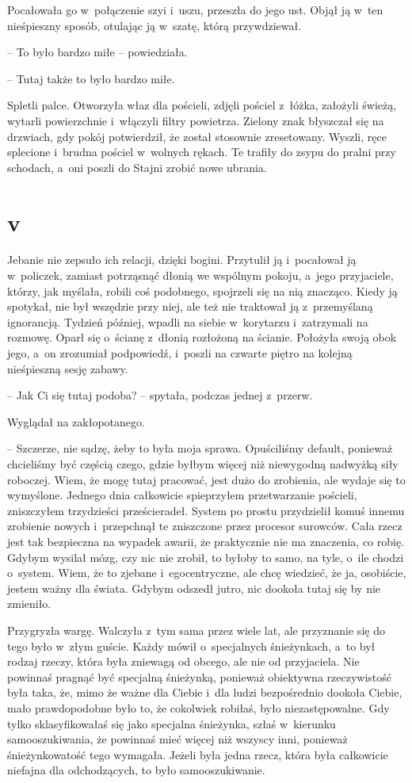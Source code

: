 \documentclass[oneside,polish,11pt,sfheadings]{mwbk}
\begin{document}
Pocałowała go w~połączenie szyi i~uszu, przeszła do jego ust. Objął ją w~ten nieśpieszny sposób, otulając ją w~szatę, którą przywdziewał.

-- To było bardzo miłe -- powiedziała.

-- Tutaj także to było bardzo miłe.

Spletli palce. Otworzyła właz dla pościeli, zdjęli pościel z~łóżka,
założyli świeżą, wytarli powierzchnie i~włączyli filtry powietrza.
Zielony znak błyszczał się na drzwiach, gdy pokój potwierdził, że został
stosownie zresetowany. Wyszli, ręce splecione i~brudna pościel w~wolnych
rękach. Te trafiły do zsypu do pralni przy schodach, a~oni poszli do
Stajni zrobić nowe ubrania.

\chapter*{v}

Jebanie nie zepsuło ich relacji, dzięki bogini. Przytulił ją i~pocałował
ją w~policzek, zamiast potrząsnąć dłonią we wspólnym pokoju, a~jego
przyjaciele, którzy, jak myślała, robili coś podobnego, spojrzeli się
na nią znacząco. Kiedy ją spotykał, nie był wszędzie przy niej, ale też
nie traktował ją z~przemyślaną ignorancją. Tydzień później, wpadli na
siebie w~korytarzu i~zatrzymali na rozmowę. Oparł się o~ścianę z~dłonią
rozłożoną na ścianie. Położyła swoją obok jego, a~on zrozumiał
podpowiedź, i~poszli na czwarte piętro na kolejną nieśpieszną sesję
zabawy.

-- Jak Ci się tutaj podoba? -- spytała, podczas jednej z~przerw.

Wyglądał na zakłopotanego. 

-- Szczerze, nie sądzę, żeby to była moja
sprawa. Opuściliśmy default, ponieważ chcieliśmy być częścią czego,
gdzie byłbym więcej niż niewygodną nadwyżką siły roboczej. Wiem, że mogę
tutaj pracować, jest dużo do zrobienia, ale wydaje się to wymyślone.
Jednego dnia całkowicie spieprzyłem przetwarzanie pościeli, zniszczyłem
trzydzieści prześcieradeł. System po prostu przydzielił komuś innemu
zrobienie nowych i~przepchnął te zniszczone przez procesor surowców.
Cała rzecz jest tak bezpieczna na wypadek awarii, że praktycznie nie ma
znaczenia, co robię. Gdybym wysilał mózg, czy nic nie zrobił, to byłoby
to samo, na tyle, o~ile chodzi o~system. Wiem, że to zjebane i~egocentryczne, ale chcę wiedzieć, że ja, osobiście, jestem ważny dla
świata. Gdybym odszedł jutro, nic dookoła tutaj się by nie zmieniło.

Przygryzła wargę. Walczyła z~tym sama przez wiele lat, ale przyznanie
się do tego było w~złym guście. Każdy mówił o~specjalnych śnieżynkach, a~to był rodzaj rzeczy, która była zniewagą od obcego, ale nie od
przyjaciela. Nie powinnaś pragnąć być specjalną śnieżynką, ponieważ
obiektywna rzeczywistość była taka, że, mimo że ważne dla Ciebie i~dla
ludzi bezpośrednio dookoła Ciebie, mało prawdopodobne było to, że
cokolwiek robiłaś, było niezastępowalne. Gdy tylko sklasyfikowałaś się
jako specjalna śnieżynka, szłaś w~kierunku samooszukiwania, że powinnaś
mieć więcej niż wszyscy inni, ponieważ śnieżynkowatość tego wymagała.
Jeżeli była jedna rzecz, która była całkowicie niefajna dla
odchodzących, to było samooszukiwanie.
\end{document}

